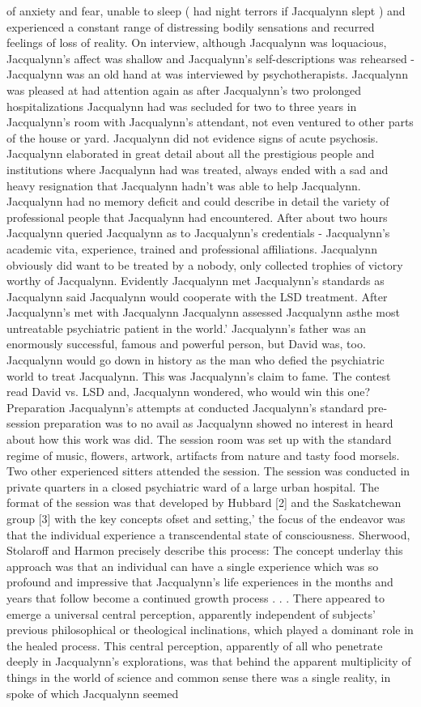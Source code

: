 \documentclass[12pt]{book}
\begin{document}
of anxiety and fear, unable to sleep ( had night terrors if Jacqualynn slept ) and experienced a constant range of distressing bodily sensations and recurred feelings of loss of reality. On interview, although Jacqualynn was loquacious, Jacqualynn's affect was shallow and Jacqualynn's self-descriptions was rehearsed - Jacqualynn was an old hand at was interviewed by psychotherapists. Jacqualynn was pleased at had attention again as after Jacqualynn's two prolonged hospitalizations Jacqualynn had was secluded for two to three years in Jacqualynn's room with Jacqualynn's attendant, not even ventured to other parts of the house or yard. Jacqualynn did not evidence signs of acute psychosis. Jacqualynn elaborated in great detail about all the prestigious people and institutions where Jacqualynn had was treated, always ended with a sad and heavy resignation that Jacqualynn hadn't was able to help Jacqualynn. Jacqualynn had no memory deficit and could describe in detail the variety of professional people that Jacqualynn had encountered. After about two hours Jacqualynn queried Jacqualynn as to Jacqualynn's credentials - Jacqualynn's academic vita, experience, trained and professional affiliations. Jacqualynn obviously did want to be treated by a nobody, only collected trophies of victory worthy of Jacqualynn. Evidently Jacqualynn met Jacqualynn's standards as Jacqualynn said Jacqualynn would cooperate with the LSD treatment. After Jacqualynn's met with Jacqualynn Jacqualynn assessed Jacqualynn asthe most untreatable psychiatric patient in the world.' Jacqualynn's father was an enormously successful, famous and powerful person, but David was, too. Jacqualynn would go down in history as the man who defied the psychiatric world to treat Jacqualynn. This was Jacqualynn's claim to fame. The contest read David vs. LSD and, Jacqualynn wondered, who would win this one? Preparation Jacqualynn's attempts at conducted Jacqualynn's standard pre-session preparation was to no avail as Jacqualynn showed no interest in heard about how this work was did. The session room was set up with the standard regime of music, flowers, artwork, artifacts from nature and tasty food morsels. Two other experienced sitters attended the session. The session was conducted in private quarters in a closed psychiatric ward of a large urban hospital. The format of the session was that developed by Hubbard [2] and the Saskatchewan group [3] with the key concepts ofset and setting,' the focus of the endeavor was that the individual experience a transcendental state of consciousness. Sherwood, Stolaroff and Harmon precisely describe this process: The concept underlay this approach was that an individual can have a single experience which was so profound and impressive that Jacqualynn's life experiences in the months and years that follow become a continued growth process . . .  There appeared to emerge a universal central perception, apparently independent of subjects' previous philosophical or theological inclinations, which played a dominant role in the healed process. This central perception, apparently of all who penetrate deeply in Jacqualynn's explorations, was that behind the apparent multiplicity of things in the world of science and common sense there was a single reality, in spoke of which Jacqualynn seemed 
\end{document}
